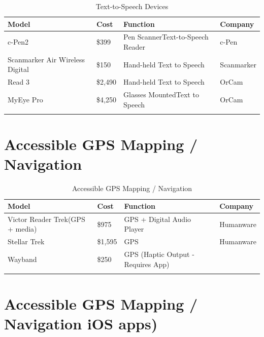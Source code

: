 \documentclass[14pt, letterpaper,twoside]{extreport}
\begin{document}
\begin{longtable}[]{@{}
 >{\raggedright\arraybackslash}p{}
 >{\raggedright\arraybackslash}p{}
 >{\raggedright\arraybackslash}p{}
 >{\raggedright\arraybackslash}p{}@{}
 }
\toprule\noalign{}

\textbf{Model}
&
\textbf{Cost}
&
\textbf{Function}
&
\textbf{Company}
\\
\midrule\noalign{}
\endhead
\bottomrule\noalign{}
\endlastfoot
c-Pen2 & \$399 & Pen Scanner\break Text-to-Speech Reader & c-Pen \\[1.0em]
Scanmarker Air Wireless Digital & \$150 & Hand-held Text to Speech & Scanmarker \\[1.0em]
Read 3 & \$2,490 & Hand-held Text to Speech & OrCam \\[1.0em]
MyEye Pro & \$4,250 & Glasses Mounted\break Text to Speech & OrCam \\[1.0em]\hline
\caption{ Text-to-Speech Devices}
\end{longtable}


\hypertarget{accessible-gps-mapping}{%
\pagebreak \chapter*{Accessible GPS Mapping / Navigation}\label{accessible-gps-mapping}}



\begin{longtable}[]{@{}
 >{\raggedright\arraybackslash}p{}
 >{\raggedright\arraybackslash}p{}
 >{\raggedright\arraybackslash}p{}
 >{\raggedright\arraybackslash}p{}@{}
 }
\toprule\noalign{}

Model
&
Cost
&
Function
&
Company
\\
\midrule\noalign{}
\endhead
\bottomrule\noalign{}
\endlastfoot
Victor Reader Trek(GPS + media) & \$975 & GPS + Digital Audio Player & Humanware \\[1.0em]
Stellar Trek & \$1,595 & GPS & Humanware \\[1.0em]
Wayband & \$250 & GPS (Haptic Output - Requires App) & \\[1.0em]\hline
\caption{ Accessible GPS Mapping / Navigation }
\end{longtable}


\hypertarget{accessible-gps}{%
\chapter*{Accessible GPS Mapping / Navigation iOS apps)}\label{accessible-gps}}
\end{document}
